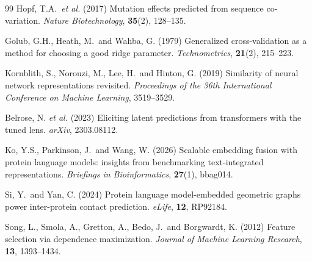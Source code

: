 \documentclass[11pt,a4paper]{article}
\newcommand{\revised}[1]{#1}
\newcommand{\rtwo}[1]{#1}
\begin{document}
\begin{thebibliography}{99}
Hopf, T.A.\ \textit{et al.} (2017)
Mutation effects predicted from sequence co-variation.
\textit{Nature Biotechnology}, \textbf{35}(2), 128--135.

\revised{Golub, G.H., Heath, M.\ and Wahba, G. (1979)
Generalized cross-validation as a method for choosing a good ridge parameter.
\textit{Technometrics}, \textbf{21}(2), 215--223.}

\revised{Kornblith, S., Norouzi, M., Lee, H.\ and Hinton, G. (2019)
Similarity of neural network representations revisited.
\textit{Proceedings of the 36th International Conference on Machine Learning},
3519--3529.}

\revised{Belrose, N. \textit{et al.} (2023)
Eliciting latent predictions from transformers with the tuned lens.
\textit{arXiv}, 2303.08112.}

\rtwo{Ko, Y.S., Parkinson, J.\ and Wang, W. (2026)
Scalable embedding fusion with protein language models: insights from
benchmarking text-integrated representations.
\textit{Briefings in Bioinformatics}, \textbf{27}(1), bbag014.}

\rtwo{Si, Y.\ and Yan, C. (2024)
Protein language model-embedded geometric graphs power inter-protein contact
prediction.
\textit{eLife}, \textbf{12}, RP92184.}

\rtwo{Song, L., Smola, A., Gretton, A., Bedo, J.\ and Borgwardt, K. (2012)
Feature selection via dependence maximization.
\textit{Journal of Machine Learning Research}, \textbf{13}, 1393--1434.}

\end{thebibliography}
\end{document}
